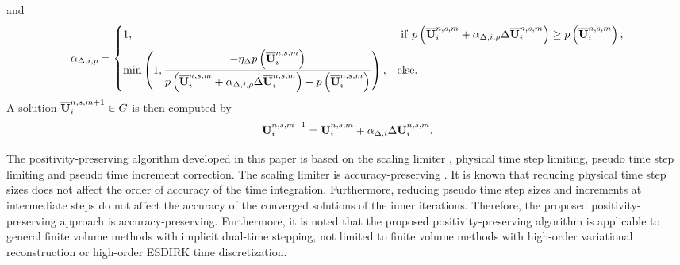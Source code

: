 and 
\begin{equation}
	\alpha_{\mathrm\Delta,i,p} = \begin{dcases}
		1, & \ \mathrm{if} \ p \left(\overline{\mathbf{U}}^{n,s,m}_i + \alpha_{\mathrm\Delta,i,\rho} \mathrm\Delta \overline{\mathbf{U}}_i^{n,s,m}\right) \geq  p \left(\overline{\mathbf{U}}^{n,s,m}_i\right), \\
		\min\left(1, \dfrac{-\eta_\mathrm\Delta p \left(\overline{\mathbf{U}}^{n,s,m}_i\right)}{p \left(\overline{\mathbf{U}}^{n,s,m}_i +  \alpha_{\mathrm\Delta,i,\rho} \mathrm\Delta \overline{\mathbf{U}}_i^{n,s,m}\right)-  p \left(\overline{\mathbf{U}}^{n,s,m}_i\right)} \right), &
		\mathrm{else}.
	\end{dcases}
\end{equation}
A solution $\overline{\mathbf{U}}^{n,s,m+1}_i \in G$ is then computed by
\begin{equation}
	\overline{\mathbf{U}}_i^{n,s,m+1} = \overline{\mathbf{U}}_i^{n,s,m} + \alpha_{\mathrm\Delta,i} \mathrm\Delta \overline{\mathbf{U}}_i^{n,s,m}.
\end{equation}


The positivity-preserving algorithm developed in this paper is based on the scaling limiter \cite{zhang2010positivity}, physical time step limiting, pseudo time step limiting and pseudo time increment correction. The scaling limiter is accuracy-preserving \cite{zhang2010positivity}. It is known that reducing physical time step sizes does not affect the order of accuracy of the time integration. Furthermore, reducing pseudo time step sizes and increments at intermediate steps do not affect the accuracy of the converged solutions of the inner iterations. Therefore, the proposed positivity-preserving approach is accuracy-preserving. Furthermore, it is noted that the proposed positivity-preserving algorithm is applicable to general finite volume methods with implicit dual-time stepping, not limited to finite volume methods with high-order variational reconstruction or high-order ESDIRK time discretization.

